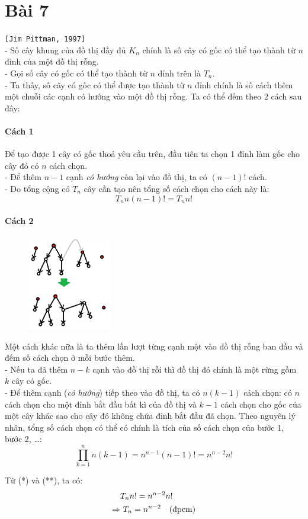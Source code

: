 \documentclass[main.tex]{subfiles}
\begin{document}
\section{Bài 7}
\texttt{[Jim Pittman, 1997]}\\

- Số cây khung của đồ thị đầy đủ $K_n$ chính là số cây có gốc có thể tạo thành từ $n$ đỉnh của một đồ thị rỗng. \\
- Gọi số cây có gốc có thể tạo thành từ $n$ đỉnh trên là $T_n$.\\
- Ta thấy, số cây có gốc có thể được tạo thành từ $n$ đỉnh chính là số cách thêm một chuỗi các cạnh có hướng vào một đồ thị rỗng. Ta có thể đếm theo 2 cách sau đây:

\paragraph*{Cách 1}
Để tạo được 1 cây có gốc thoả yêu cầu trên, đầu tiên ta chọn 1 đỉnh làm gốc cho cây đó \Ra có $n$ cách chọn.\\
- Để thêm $n-1$ cạnh \textit{có hướng} còn lại vào đồ thị, ta có $(n-1)!$ cách.\\
- Do tổng cộng có $T_n$ cây cần tạo nên tổng số cách chọn cho cách này là:
\begin{equation}
    T_nn(n-1)!=T_nn! \tag{*}
\end{equation}

\paragraph*{Cách 2}

\begin{figure}
    \includegraphics[width=0.33\textwidth]{image/Bai7.png}
    \vspace*{-1cm}
\end{figure}
Một cách khác nữa là ta thêm lần lượt từng cạnh một vào đồ thị rỗng ban đầu và đếm số cách chọn ở mỗi bước thêm. \\
- Nếu ta đã thêm $n-k$ cạnh vào đồ thị rồi thì đồ thị đó chính là một rừng gồm $k$ cây có gốc.\\
- Để thêm cạnh (\textit{có hướng}) tiếp theo vào đồ thị, ta có $n(k-1)$ cách chọn: có $n$ cách chọn cho một đỉnh bắt đầu bất kì của đồ thị và $k-1$ cách chọn cho gốc của một cây khác sao cho cây đó không chứa đỉnh bắt đầu đã chọn. Theo nguyên lý nhân, tổng số cách chọn có thể có chính là tích của số cách chọn của bước 1, bước 2, \dots:
\begin{equation}
    \prod^{n}_{k=1}n(k-1)=n^{n-1}(n-1)!=n^{n-2}n! \tag{**}
\end{equation}

Từ (*) và (**), ta có:
$$
\begin{aligned}
& T_nn! = n^{n-2}n! \\
\Rightarrow &\ T_n = n^{n-2} \quad \text{(đpcm)}
\end{aligned}
$$
\end{document}

